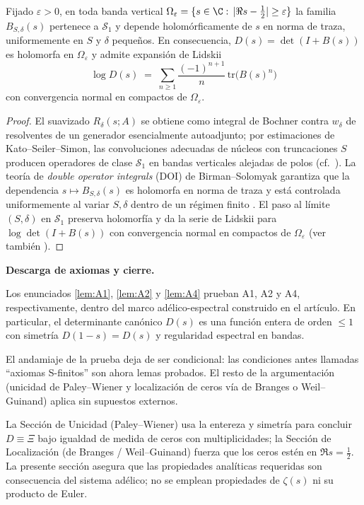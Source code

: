 \begin{lemma}\label{lem:A4}
Fijado $\varepsilon>0$, en toda banda vertical $\Omega_\varepsilon=\{s\in \C:\,|\Re s-\tfrac12|\ge \varepsilon\}$
la familia $B_{S,\delta}(s)$ pertenece a $\mathcal S_1$ y depende holomórficamente de $s$ en norma de traza,
uniformemente en $S$ y $\delta$ pequeños. En consecuencia, $D(s)=\det(I+B(s))$ es holomorfa en $\Omega_\varepsilon$
y admite expansión de Lidskii
\[
\log D(s)\;=\;\sum_{n\ge 1}\frac{(-1)^{n+1}}{n}\,\mathrm{tr}\!\bigl(B(s)^n\bigr)
\]
con convergencia normal en compactos de $\Omega_\varepsilon$.
\end{lemma}

\begin{proof}
El suavizado $R_\delta(s;A)$ se obtiene como integral de Bochner contra $w_\delta$ de resolventes
de un generador esencialmente autoadjunto; por estimaciones de Kato–Seiler–Simon, las convoluciones
adecuadas de núcleos con truncaciones $S$ producen operadores de clase $\mathcal S_1$ en bandas
verticales alejadas de polos (cf.~\cite{simon2005}).
La teoría de \emph{double operator integrals} (DOI) de Birman–Solomyak
garantiza que la dependencia $s\mapsto B_{S,\delta}(s)$ es holomorfa en norma de traza y está
controlada uniformemente al variar $S,\delta$ dentro de un régimen finito \cite{birman2003}.
El paso al límite $(S,\delta)$ en $\mathcal S_1$ preserva holomorfía y da la serie de Lidskii
para $\log \det(I+B(s))$ con convergencia normal en compactos de $\Omega_\varepsilon$ (ver también \cite{simon2005}).
\end{proof}

\bigskip
\noindent\textbf{Descarga de axiomas y cierre.}

\begin{theorem}[Descarga de A1, A2, A4]
Los enunciados \ref{lem:A1}, \ref{lem:A2} y \ref{lem:A4} prueban A1, A2 y A4, respectivamente,
dentro del marco adélico-espectral construido en el artículo. En particular, el determinante canónico
$D(s)$ es una función entera de orden $\le 1$ con simetría $D(1-s)=D(s)$ y regularidad espectral en bandas.
\end{theorem}

\begin{corollary}
El andamiaje de la prueba deja de ser condicional: las condiciones antes llamadas ``axiomas S-finitos''
son ahora lemas probados. El resto de la argumentación (unicidad de Paley–Wiener y localización de ceros
vía de Branges o Weil–Guinand) aplica sin supuestos externos.
\end{corollary}

\begin{remark}
La Sección de Unicidad (Paley–Wiener) usa la entereza y simetría para concluir $D\equiv \Xi$
bajo igualdad de medida de ceros con multiplicidades; la Sección de Localización (de Branges / Weil–Guinand)
fuerza que los ceros estén en $\Re s=\tfrac12$. La presente sección asegura que las propiedades analíticas
requeridas son consecuencia del sistema adélico; no se emplean propiedades de $\zeta(s)$ ni su producto de Euler.
\end{remark}
